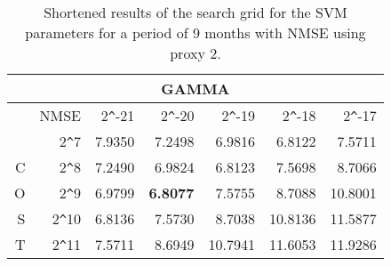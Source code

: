 \begin{table}[h!]
\centering
\begin{adjustbox}{width=\textwidth}
\begin{tabular}{|r|r|rrrrr|}
\hline
\multicolumn{7}{|c|}{GAMMA} \tabularnewline
   \hline
  &NMSE& 2\verb|^|-21 & 2\verb|^|-20 & 2\verb|^|-19 & 2\verb|^|-18 & 2\verb|^|-17 \\ 
  \hline
  &2\verb|^|7 & 7.9350 & 7.2498 & 6.9816 & 6.8122 & 7.5711 \\ 
  C&2\verb|^|8 & 7.2490 & 6.9824 & 6.8123 & 7.5698 & 8.7066 \\ 
  O&2\verb|^|9 & 6.9799 & \textbf{6.8077} & 7.5755 & 8.7088 & 10.8001 \\ 
  S&2\verb|^|10 & 6.8136 & 7.5730 & 8.7038 & 10.8136 & 11.5877 \\ 
  T&2\verb|^|11 & 7.5711 & 8.6949 & 10.7941 & 11.6053 & 11.9286 \\ 
   \hline
\end{tabular}
\end{adjustbox}
\caption{Shortened results of the search grid for the SVM parameters for a period of 9 months with NMSE using proxy 2.}
\end{table}